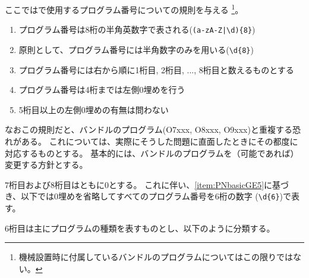 


ここでは\DMname で使用するプログラム番号についての規則を与える
\footnote{機械設置時に付属しているバンドルのプログラムについてはこの限りではない。}。



\begin{enumerate}[label=\Roman*), ref=\Roman*)]
\item プログラム番号は8桁の半角英数字で表される(\verb+(a-zA-Z|\d){8}+)
\item 原則として、プログラム番号には半角数字のみを用いる(\verb|\d{8}|)
\item プログラム番号には右から順に1桁目, 2桁目, ..., 8桁目と数えるものとする
\item プログラム番号は4桁までは左側0埋めを行う
\item\label{item:PNbasicGE5} 5桁目以上の左側0埋めの有無は問わない
\end{enumerate}
\begin{hosoku}
なおこの規則だと、バンドルのプログラム(O7xxx, O8xxx, O9xxx)と重複する恐れがある。
これについては、実際にそうした問題に直面したときにその都度に対応するものとする。
基本的には、バンドルのプログラムを（可能であれば）変更する方針とする。
\end{hosoku}


7桁目および8桁目はともに0とする。
これに伴い、\ref{item:PNbasicGE5}に基づき、以下では0埋めを省略してすべてのプログラム番号を6桁の数字 (\verb|\d{6}|)で表す。


6桁目は主にプログラムの種類を表すものとし、以下のように分類する。


